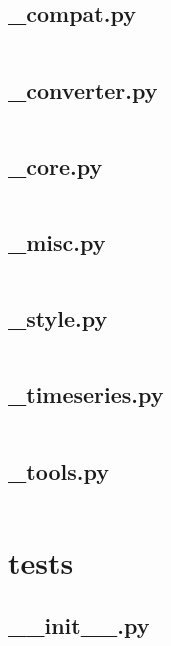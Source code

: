 \documentclass{article}
\begin{document}
\subsection{\_compat.py}
\inputminted{python}{/home/dufferzafar/dev/@clones/pandas/pandas/plotting/_compat.py}
\newpage

\subsection{\_converter.py}
\inputminted{python}{/home/dufferzafar/dev/@clones/pandas/pandas/plotting/_converter.py}
\newpage

\subsection{\_core.py}
\inputminted{python}{/home/dufferzafar/dev/@clones/pandas/pandas/plotting/_core.py}
\newpage

\subsection{\_misc.py}
\inputminted{python}{/home/dufferzafar/dev/@clones/pandas/pandas/plotting/_misc.py}
\newpage

\subsection{\_style.py}
\inputminted{python}{/home/dufferzafar/dev/@clones/pandas/pandas/plotting/_style.py}
\newpage

\subsection{\_timeseries.py}
\inputminted{python}{/home/dufferzafar/dev/@clones/pandas/pandas/plotting/_timeseries.py}
\newpage

\subsection{\_tools.py}
\inputminted{python}{/home/dufferzafar/dev/@clones/pandas/pandas/plotting/_tools.py}
\newpage

\section{tests}

\subsection{\_\_init\_\_.py}
\inputminted{python}{/home/dufferzafar/dev/@clones/pandas/pandas/tests/__init__.py}
\newpage
\end{document}
